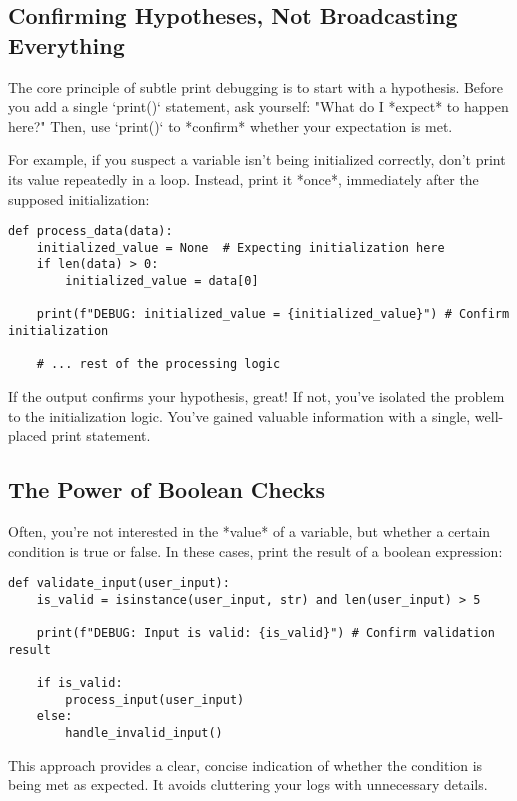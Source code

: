 \documentclass{article}
\begin{document}
{{{\subsection*{Confirming Hypotheses, Not Broadcasting Everything}

The core principle of subtle print debugging is to start with a hypothesis. Before you add a single `print()` statement, ask yourself: "What do I *expect* to happen here?" Then, use `print()` to *confirm* whether your expectation is met.

For example, if you suspect a variable isn't being initialized correctly, don't print its value repeatedly in a loop. Instead, print it *once*, immediately after the supposed initialization:

\begin{verbatim}
def process_data(data):
    initialized_value = None  # Expecting initialization here
    if len(data) > 0:
        initialized_value = data[0]

    print(f"DEBUG: initialized_value = {initialized_value}") # Confirm initialization

    # ... rest of the processing logic
\end{verbatim}

If the output confirms your hypothesis, great! If not, you've isolated the problem to the initialization logic. You've gained valuable information with a single, well-placed print statement.

\subsection*{The Power of Boolean Checks}

Often, you're not interested in the *value* of a variable, but whether a certain condition is true or false. In these cases, print the result of a boolean expression:

\begin{verbatim}
def validate_input(user_input):
    is_valid = isinstance(user_input, str) and len(user_input) > 5

    print(f"DEBUG: Input is valid: {is_valid}") # Confirm validation result

    if is_valid:
        process_input(user_input)
    else:
        handle_invalid_input()
\end{verbatim}

This approach provides a clear, concise indication of whether the condition is being met as expected. It avoids cluttering your logs with unnecessary details.

}}}
\end{document}

